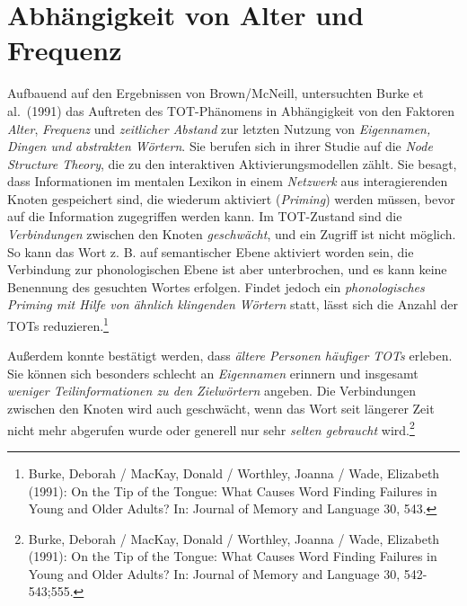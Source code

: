 \documentclass[
  letterpaper,
]{scrbook}
\begin{document}
\hypertarget{abhuxe4ngigkeit-von-alter-und-frequenz}{%
\section{Abhängigkeit von Alter und
Frequenz}\label{abhuxe4ngigkeit-von-alter-und-frequenz}}

Aufbauend auf den Ergebnissen von Brown/McNeill, untersuchten Burke et
al.~(1991) das Auftreten des TOT-Phänomens in Abhängigkeit von den
Faktoren \emph{Alter}, \emph{Frequenz} und \emph{zeitlicher Abstand} zur
letzten Nutzung von \emph{Eigennamen, Dingen und abstrakten Wörtern}.
Sie berufen sich in ihrer Studie auf die \emph{Node Structure Theory},
die zu den interaktiven Aktivierungsmodellen zählt. Sie besagt, dass
Informationen im mentalen Lexikon in einem \emph{Netzwerk} aus
interagierenden Knoten gespeichert sind, die wiederum aktiviert
(\emph{Priming}) werden müssen, bevor auf die Information zugegriffen
werden kann. Im TOT-Zustand sind die \emph{Verbindungen} zwischen den
Knoten \emph{geschwächt}, und ein Zugriff ist nicht möglich. So kann das
Wort z. B. auf semantischer Ebene aktiviert worden sein, die Verbindung
zur phonologischen Ebene ist aber unterbrochen, und es kann keine
Benennung des gesuchten Wortes erfolgen. Findet jedoch ein
\emph{phonologisches Priming mit Hilfe von ähnlich klingenden Wörtern}
statt, lässt sich die Anzahl der TOTs reduzieren.\footnote{Burke,
  Deborah / MacKay, Donald / Worthley, Joanna / Wade, Elizabeth (1991):
  On the Tip of the Tongue: What Causes Word Finding Failures in Young
  and Older Adults? In: Journal of Memory and Language 30, 543.}

Außerdem konnte bestätigt werden, dass \emph{ältere Personen häufiger
TOTs} erleben. Sie können sich besonders schlecht an \emph{Eigennamen}
erinnern und insgesamt \emph{weniger Teilinformationen zu den
Zielwörtern} angeben. Die Verbindungen zwischen den Knoten wird auch
geschwächt, wenn das Wort seit längerer Zeit nicht mehr abgerufen wurde
oder generell nur sehr \emph{selten gebraucht} wird.\footnote{Burke,
  Deborah / MacKay, Donald / Worthley, Joanna / Wade, Elizabeth (1991):
  On the Tip of the Tongue: What Causes Word Finding Failures in Young
  and Older Adults? In: Journal of Memory and Language 30, 542-543;555.}
\end{document}
